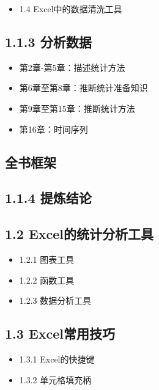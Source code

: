 \documentclass[
  letterpaper,
  DIV=11,
  numbers=noendperiod]{scrartcl}
\providecommand{\tightlist}{%
  \setlength{\itemsep}{0pt}\setlength{\parskip}{0pt}}\usepackage{longtable,booktabs,array}
\begin{document}
\begin{itemize}
\tightlist
\item
  1.4 Excel中的数据清洗工具
\end{itemize}

\subsection{1.1.3 分析数据}\label{ux5206ux6790ux6570ux636e}

\begin{itemize}
\item
  第2章-第5章：描述统计方法
\item
  第6章至第8章：推断统计准备知识
\item
  第9章至第15章：推断统计方法
\item
  第16章：时间序列
\end{itemize}

\subsection{全书框架}\label{ux5168ux4e66ux6846ux67b6}

\subsection{1.1.4 提炼结论}\label{ux63d0ux70bcux7ed3ux8bba}

\subsection{1.2
Excel的统计分析工具}\label{excelux7684ux7edfux8ba1ux5206ux6790ux5de5ux5177}

\begin{itemize}
\item
  1.2.1 图表工具
\item
  1.2.2 函数工具
\item
  1.2.3 数据分析工具
\end{itemize}

\subsection{1.3 Excel常用技巧}\label{excelux5e38ux7528ux6280ux5de7}

\begin{itemize}
\item
  1.3.1 Excel的快捷键
\item
  1.3.2 单元格填充柄
\end{itemize}
\end{document}

